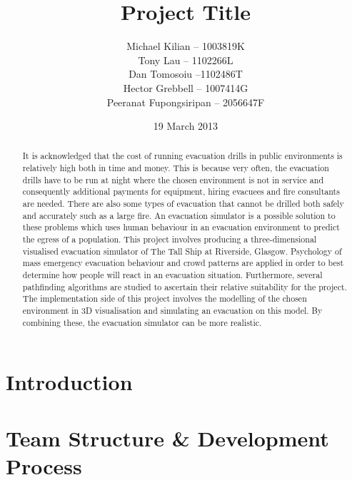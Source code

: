 \documentclass{l3proj}
\begin{document}
\title{Project Title}
\author{Michael Kilian -- 1003819K \\
        Tony Lau -- 1102266L\\
        Dan Tomosoiu --1102486T \\
        Hector Grebbell -- 1007414G \\
        Peeranat Fupongsiripan -- 2056647F}
\date{19 March 2013}
\maketitle

\begin{abstract}
It is acknowledged that the cost of 
running evacuation drills in public environments is relatively high both in time and money. This is because very often, the 
evacuation drills have to be run at night where the chosen environment is not in service and consequently additional payments for 
equipment, hiring evacuees and fire consultants are needed.
There are also some types of evacuation that cannot be drilled both safely and accurately such as a large fire.
An evacuation simulator is a possible solution to these problems which uses human behaviour in an evacuation environment 
to predict the egress of a population. This project involves producing a three-dimensional visualised 
evacuation simulator of The Tall Ship at Riverside, Glasgow. Psychology of mass emergency evacuation behaviour and crowd patterns are applied in 
order to best determine how people will react in an evacuation situation. Furthermore, several pathfinding algorithms 
are studied to ascertain their relative suitability for the project.
The implementation side of this project 
involves the modelling of the chosen environment in 3D visualisation and simulating an evacuation on this model.
By combining these, the evacuation simulator can be more realistic.
\end{abstract}

\educationalconsent
\tableofcontents
\chapter{Introduction}
\label{introduction}





\chapter{Team Structure \& Development Process}
\label{organisations}
\end{document}
